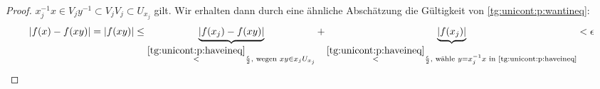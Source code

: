 \begin{proof}
    $x_j^{-1}x\in V_jy^{-1} \subset V_j V_j \subset U_{x_j}$ gilt. 
    Wir erhalten dann durch eine ähnliche Abschätzung die Gültigkeit von
    \eqref{tg:unicont:p:wantineq}:
    \[ \lvert f(x) - f(xy) \rvert = \lvert f(xy)\rvert
        \leq \underbrace{ \lvert f(x_j) - f(xy)\rvert }_{
                \overset{\eqref{tg:unicont:p:haveineq}}{<} \frac{\epsilon}{2},
                \text{ wegen } xy\in x_jU_{x_j} 
             }
          +  \underbrace{ \lvert f(x_j)\rvert }_{
                \overset{\eqref{tg:unicont:p:haveineq}}{<} \frac{\epsilon}{2},
                \text{ wähle } y=x_j^{-1}x \text{ in \eqref{tg:unicont:p:haveineq}}  
             }
        < \epsilon
    \]
\end{proof}





































